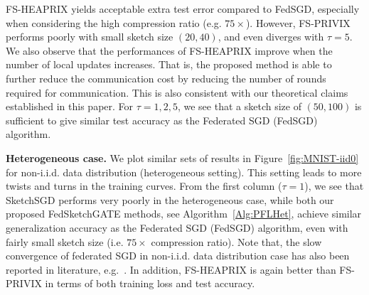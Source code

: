 \documentclass[twoside]{article}
\begin{document}
FS-HEAPRIX yields acceptable extra test error compared to FedSGD, especially when considering the high compression ratio (e.g. $75\times$). 
However, FS-PRIVIX performs poorly with small sketch size $(20,40)$, and even diverges with $\tau=5$. 
We also observe that the performances of FS-HEAPRIX improve when the number of local updates increases. That is, the proposed method is able to further reduce the communication cost by reducing the number of rounds required for communication. This is also consistent with our theoretical claims established in this paper. For $\tau=1,2,5$, we see that a sketch size of $(50,100)$ is sufficient to give similar test accuracy as the Federated SGD (FedSGD) algorithm.




\textbf{Heterogeneous case.} We plot similar sets of results in Figure~\ref{fig:MNIST-iid0} for non-i.i.d. data distribution (heterogeneous setting). This setting leads to more twists and turns in the training curves. 
From the first column ($\tau=1$), we see that SketchSGD performs very poorly in the heterogeneous case, while both our proposed FedSketchGATE methods, see Algorithm~\ref{Alg:PFLHet}, achieve similar generalization accuracy as the Federated SGD (FedSGD) algorithm, even with fairly small sketch size (i.e. $75\times$ compression ratio). Note that, the slow convergence of federated SGD in non-i.i.d. data distribution case has also been reported in literature, e.g.~\cite{mcmahan2016communication,chen2020toward}. In addition, FS-HEAPRIX is again better than FS-PRIVIX in terms of both training loss and test accuracy.
\end{document}
